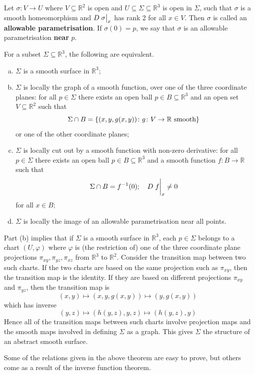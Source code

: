 \documentclass[a4paper]{article}
\begin{document}
\begin{definition}
	Let \( \sigma \colon V \to U \) where \( V \subseteq \mathbb R^2 \) is open and \( U \subseteq \Sigma \subseteq \mathbb R^3 \) is open in \( \Sigma \), such that \( \sigma \) is a smooth homeomorphism and \( D \eval{\sigma}_x \) has rank 2 for all \( x \in V \).
	Then \( \sigma \) is called an \textbf{allowable parametrisation}.
	If \( \sigma(0) = p \), we say that \( \sigma \) is an allowable parametrisation \textbf{near} \( p \).
\end{definition}
\begin{theorem}
	For a subset \( \Sigma \subseteq \mathbb R^3 \), the following are equivalent.
	\begin{enumerate}[(a)]
		\item \( \Sigma \) is a smooth surface in \( \mathbb R^3 \);
		\item \( \Sigma \) is locally the graph of a smooth function, over one of the three coordinate planes: for all \( p \in \Sigma \) there exists an open ball \( p \in B \subseteq \mathbb R^3 \) and an open set \( V \subseteq \mathbb R^2 \) such that
		      \[
			      \Sigma \cap B = \qty{(x, y, g(x,y)) \colon g \colon V \to \mathbb R \text{ smooth}}
		      \]
		      or one of the other coordinate planes;
		\item \( \Sigma \) is locally cut out by a smooth function with non-zero derivative: for all \( p \in \Sigma \) there exists an open ball \( p \in B \subseteq \mathbb R^3 \) and a smooth function \( f \colon B \to \mathbb R \) such that
		      \[
			      \Sigma \cap B = f^{-1}(0);\quad D \eval{f}_x \neq 0
		      \]
		      for all \( x \in B \);
		\item \( \Sigma \) is locally the image of an allowable parametrisation near all points.
	\end{enumerate}
\end{theorem}
\begin{remark}
	Part (b) implies that if \( \Sigma \) is a smooth surface in \( \mathbb R^3 \), each \( p \in \Sigma \) belongs to a chart \( (U, \varphi) \) where \( \varphi \) is (the restriction of) one of the three coordinate plane projections \( \pi_{xy}, \pi_{yz}, \pi_{xz} \) from \( \mathbb R^3 \) to \( \mathbb R^2 \).
	Consider the transition map between two such charts.
	If the two charts are based on the same projection such as \( \pi_{xy} \), then the transition map is the identity.
	If they are based on different projections \( \pi_{xy} \) and \( \pi_{yz} \), then the transition map is
	\[
		(x,y) \mapsto (x,y,g(x,y)) \mapsto (y,g(x,y))
	\]
	which has inverse
	\[
		(y,z) \mapsto (h(y,z),y,z) \mapsto (h(y,z),y)
	\]
	Hence all of the transition maps between such charts involve projection maps and the smooth maps involved in defining \( \Sigma \) as a graph.
	This gives \( \Sigma \) the structure of an abstract smooth surface.
\end{remark}
Some of the relations given in the above theorem are easy to prove, but others come as a result of the inverse function theorem.
\end{document}
